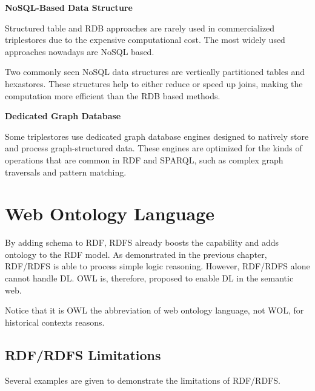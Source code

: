 \vspace{0.1in}
\noindent \textbf{NoSQL-Based Data Structure}
\vspace{0.1in}

Structured table and RDB approaches are rarely used in commercialized triplestores due to the expensive computational cost. The most widely used approaches nowadays are NoSQL based.

Two commonly seen NoSQL data structures are vertically partitioned tables and hexastores. These structures help to either reduce or speed up joins, making the computation more efficient than the RDB based methods.

\vspace{0.1in}
\noindent \textbf{Dedicated Graph Database}
\vspace{0.1in}

Some triplestores use dedicated graph database engines designed to natively store and process graph-structured data. These engines are optimized for the kinds of operations that are common in RDF and SPARQL, such as complex graph traversals and pattern matching.

\chapter{Web Ontology Language} \label{sec:owl}

By adding schema to RDF, RDFS already boosts the capability and adds ontology to the RDF model. As demonstrated in the previous chapter, RDF/RDFS is able to process simple logic reasoning. However, RDF/RDFS alone cannot handle DL. OWL is, therefore, proposed to enable DL in the semantic web.

Notice that it is OWL the abbreviation of web ontology language, not WOL, for historical contexts reasons.

\section{RDF/RDFS Limitations} \label{subsec:rdfrdfslimitations}

Several examples are given to demonstrate the limitations of RDF/RDFS.


